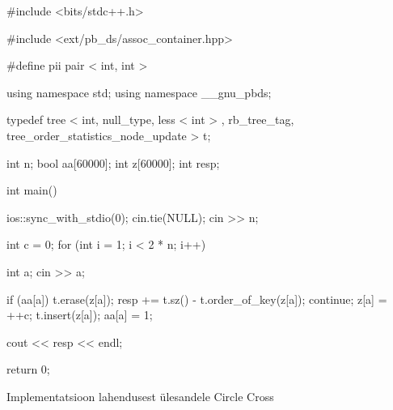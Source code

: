 \documentclass{trkut}
\theoremstyle{definition}
\begin{document}
\begin{cclol}
#include <bits/stdc++.h>

#include <ext/pb_ds/assoc_container.hpp>

#define pii pair < int, int >

 using namespace std;
using namespace __gnu_pbds;

typedef tree < int, null_type, less < int > , 
rb_tree_tag, tree_order_statistics_node_update > t;

int n;
bool aa[60000];
int z[60000];
int resp;

int main() {
  ios::sync_with_stdio(0);
  cin.tie(NULL);
  cin >> n;

  int c = 0;
  for (int i = 1; i < 2 * n; i++) {
    int a;
    cin >> a;

    if (aa[a]) {
      t.erase(z[a]);
      resp += t.sz() - t.order_of_key(z[a]);
      continue;
    }
    z[a] = ++c;
    t.insert(z[a]);
    aa[a] = 1;
  }

  cout << resp << endl;

  return 0;
}
\end{cclol}
\begin{kk}[H]%
    \caption{Implementatsioon lahendusest ülesandele Circle Cross}%
    \label{EMaxx}%
    \end{kk}
\end{document}
